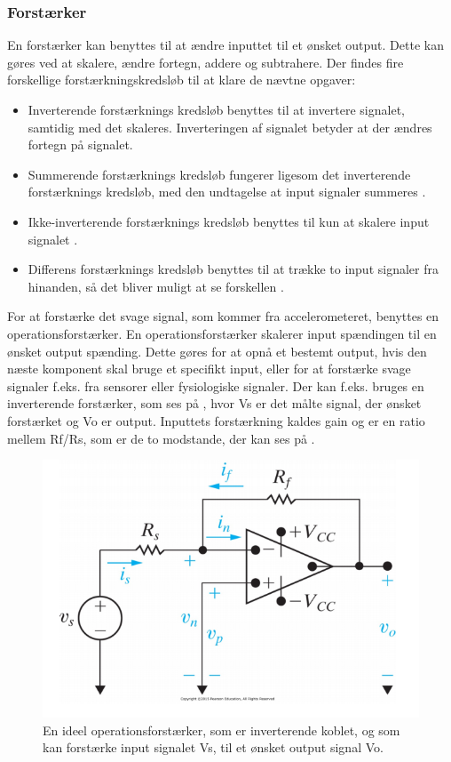 \subsubsection{Forstærker}
En forstærker kan benyttes til at ændre inputtet til et ønsket output. Dette kan gøres ved at skalere, ændre fortegn, addere og subtrahere. Der findes fire forskellige forstærkningskredsløb til at klare de nævtne opgaver: \cite{Nilsson2011}
\begin{itemize}
\item Inverterende forstærknings kredsløb benyttes til at invertere signalet, samtidig med det skaleres. Inverteringen af signalet betyder at der ændres fortegn på signalet. \cite{Nilsson2011} 
\item Summerende forstærknings kredsløb fungerer ligesom det inverterende forstærknings kredsløb, med den undtagelse at input signaler summeres \cite{Nilsson2011}.
\item Ikke-inverterende forstærknings kredsløb benyttes til kun at skalere input signalet \cite{Nilsson2011}.
\item Differens forstærknings kredsløb benyttes til at trække to input signaler fra hinanden, så det bliver muligt at se forskellen \cite{Nilsson2011}. 
\end{itemize} 

For at forstærke det svage signal, som kommer fra accelerometeret, benyttes en operationsforstærker. En operationsforstærker skalerer input spændingen til en ønsket output spænding. Dette gøres for at opnå et bestemt output, hvis den næste komponent skal bruge et specifikt input, eller for at forstærke svage signaler f.eks. fra sensorer eller fysiologiske signaler. Der kan f.eks. bruges en inverterende forstærker, som ses på , hvor Vs er det målte signal, der ønsket forstærket og Vo er output. Inputtets forstærkning kaldes gain og er en ratio mellem Rf/Rs, som er de to modstande, der kan ses på . \cite{Nilsson2011}

\begin{figure}[H]
\centering
\includegraphics[scale=0.6]{figures/bProblemanalyse/inverterendeforstaerker.png}
\caption{En ideel operationsforstærker, som er inverterende koblet, og som kan forstærke input signalet Vs, til et ønsket output signal Vo. \cite{Nilsson2011}}
\label{invf}
\end{figure}


